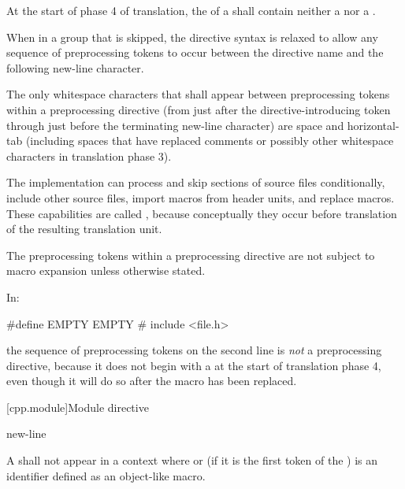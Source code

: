 \pnum
At the start of phase 4 of translation,
the  of a  shall
contain neither a  nor a .

\pnum
When in a group that is skipped, the directive
syntax is relaxed to allow any sequence of preprocessing tokens to occur between
the directive name and the following new-line character.

\pnum
The only whitespace characters that shall appear
between preprocessing tokens
within a preprocessing directive
(from just after the directive-introducing token
through just before the terminating new-line character)
are space and horizontal-tab
(including spaces that have replaced comments
or possibly other whitespace characters
in translation phase 3).

\pnum
The implementation can
process and skip sections of source files conditionally,
include other source files,
import macros from header units,
and replace macros.
These capabilities are called
,
because conceptually they occur
before translation of the resulting translation unit.

\pnum
The preprocessing tokens within a preprocessing directive
are not subject to macro expansion unless otherwise stated.

\begin{example}
In:
\begin{codeblock}
#define EMPTY
EMPTY   #   include <file.h>
\end{codeblock}
the sequence of preprocessing tokens on the second line is \textit{not}
a preprocessing directive, because it does not begin with a \tcode{\#} at the start of
translation phase 4, even though it will do so after the macro 
has been replaced.
\end{example}

[cpp.module]{Module directive}
%

\begin{bnf}
\br
       \terminal{;} new-line
\end{bnf}

\pnum
A  shall not
appear in a context where 
or (if it is the first token of the ) 
is an identifier defined as an object-like macro.

